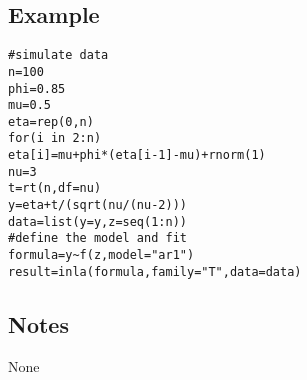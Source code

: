 \documentclass[a4paper,11pt]{article}
\begin{document}
\subsection*{Example}
\begin{verbatim}
#simulate data
n=100
phi=0.85
mu=0.5
eta=rep(0,n)
for(i in 2:n)
eta[i]=mu+phi*(eta[i-1]-mu)+rnorm(1)
nu=3
t=rt(n,df=nu)
y=eta+t/(sqrt(nu/(nu-2)))
data=list(y=y,z=seq(1:n))
#define the model and fit
formula=y~f(z,model="ar1")
result=inla(formula,family="T",data=data)
\end{verbatim}

\subsection*{Notes}
None
\end{document}
